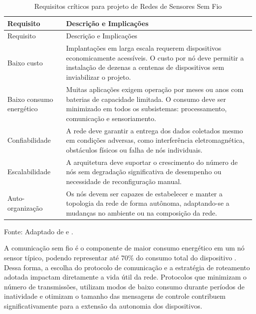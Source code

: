 {\def\LTcaptype{quadro}
\begin{longtable}[]{@{}
  >{\centering\arraybackslash}p{}
  >{\centering\arraybackslash}p{}@{}}
\caption{Requisitos críticos para projeto de Redes de Sensores Sem Fio}\label{quadro:req-wsn}\\
\toprule\noalign{}
\begin{minipage}[b]{\linewidth}\centering
Requisito
\end{minipage} & \begin{minipage}[b]{\linewidth}\centering
Descrição e Implicações
\end{minipage} \\
\midrule\noalign{}
\endfirsthead
\toprule\noalign{}
\begin{minipage}[b]{\linewidth}\centering
Requisito
\end{minipage} & \begin{minipage}[b]{\linewidth}\centering
Descrição e Implicações
\end{minipage} \\
\midrule\noalign{}
\endhead
\bottomrule\noalign{}
\endlastfoot
Baixo custo & Implantações em larga escala requerem dispositivos
economicamente acessíveis. O custo por nó deve permitir a instalação de
dezenas a centenas de dispositivos sem inviabilizar o projeto. \\
Baixo consumo energético & Muitas aplicações exigem operação por meses
ou anos com baterias de capacidade limitada. O consumo deve ser
minimizado em todos os subsistemas: processamento, comunicação e
sensoriamento. \\
Confiabilidade & A rede deve garantir a entrega dos dados coletados
mesmo em condições adversas, como interferência eletromagnética,
obstáculos físicos ou falha de nós individuais. \\
Escalabilidade & A arquitetura deve suportar o crescimento do número de
nós sem degradação significativa de desempenho ou necessidade de
reconfiguração manual. \\
Auto-organização & Os nós devem ser capazes de estabelecer e manter a
topologia da rede de forma autônoma, adaptando-se a mudanças no ambiente
ou na composição da rede. \\
\end{longtable}
}

Fonte: Adaptado de  e .

A comunicação sem fio é o componente de maior consumo energético em um
nó sensor típico, podendo representar até 70\% do consumo total do
dispositivo \cite{priyadarshi2025}. Dessa forma, a escolha do protocolo
de comunicação e a estratégia de roteamento adotada impactam diretamente
a vida útil da rede. Protocolos que minimizam o número de transmissões,
utilizam modos de baixo consumo durante períodos de inatividade e
otimizam o tamanho das mensagens de controle contribuem
significativamente para a extensão da autonomia dos dispositivos.

